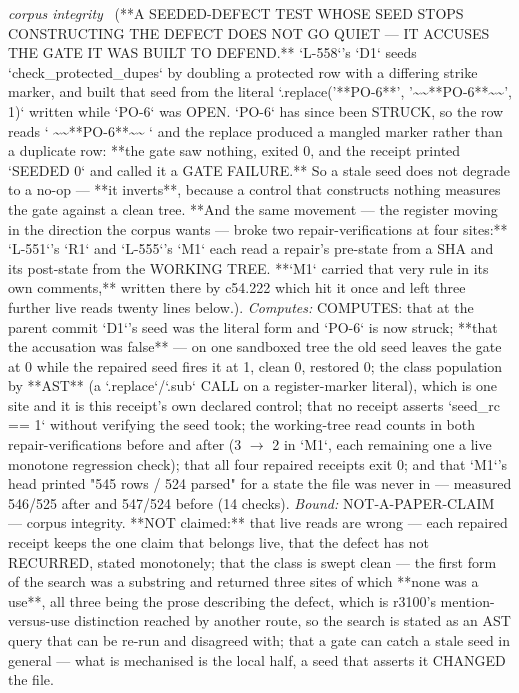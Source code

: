 \begin{description}
\textit{corpus integrity} \ (**A SEEDED-DEFECT TEST WHOSE SEED STOPS CONSTRUCTING THE DEFECT DOES NOT GO QUIET --- IT ACCUSES THE GATE IT WAS BUILT TO DEFEND.** `L-558`'s `D1` seeds `check\_protected\_dupes` by doubling a protected row with a differing strike marker, and built that seed from the literal `.replace('**PO-6**', '\textasciitilde{}\textasciitilde{}**PO-6**\textasciitilde{}\textasciitilde{}', 1)` written while `PO-6` was OPEN. `PO-6` has since been STRUCK, so the row reads `\textbar{} \textasciitilde{}\textasciitilde{}**PO-6**\textasciitilde{}\textasciitilde{} \textbar{}` and the replace produced a mangled marker rather than a duplicate row: **the gate saw nothing, exited 0, and the receipt printed `SEEDED 0` and called it a GATE FAILURE.** So a stale seed does not degrade to a no-op --- **it inverts**, because a control that constructs nothing measures the gate against a clean tree. **And the same movement --- the register moving in the direction the corpus wants --- broke two repair-verifications at four sites:** `L-551`'s `R1` and `L-555`'s `M1` each read a repair's pre-state from a SHA and its post-state from the WORKING TREE. **`M1` carried that very rule in its own comments,** written there by c54.222 which hit it once and left three further live reads twenty lines below.). 
\emph{Computes:} COMPUTES: that at the parent commit `D1`'s seed was the literal form and `PO-6` is now struck; **that the accusation was false** --- on one sandboxed tree the old seed leaves the gate at 0 while the repaired seed fires it at 1, clean 0, restored 0; the class population by **AST** (a `.replace`/`.sub` CALL on a register-marker literal), which is one site and it is this receipt's own declared control; that no receipt asserts `seed\_rc == 1` without verifying the seed took; the working-tree read counts in both repair-verifications before and after (3 \ensuremath{\to} 2 in `M1`, each remaining one a live monotone regression check); that all four repaired receipts exit 0; and that `M1`'s head printed "545 rows / 524 parsed" for a state the file was never in --- measured 546/525 after and 547/524 before (14 checks).
 \emph{Bound:} NOT-A-PAPER-CLAIM --- corpus integrity. **NOT claimed:** that live reads are wrong --- each repaired receipt keeps the one claim that belongs live, that the defect has not RECURRED, stated monotonely; that the class is swept clean --- the first form of the search was a substring and returned three sites of which **none was a use**, all three being the prose describing the defect, which is r3100's mention-versus-use distinction reached by another route, so the search is stated as an AST query that can be re-run and disagreed with; that a gate can catch a stale seed in general --- what is mechanised is the local half, a seed that asserts it CHANGED the file.

\end{description}
